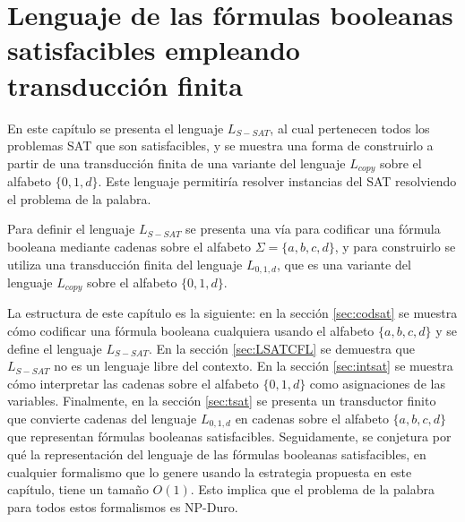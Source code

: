 


\chapter{Lenguaje de las fórmulas booleanas satisfacibles empleando transducción finita}
\label{chap:LSATFT}


En este capítulo se presenta el lenguaje $L_{S-SAT}$, al cual pertenecen todos los problemas SAT que son 
satisfacibles, y se muestra una forma de construirlo a partir de una transducción finita de una variante 
del lenguaje $L_{copy}$ sobre el alfabeto $\{0,1,d\}$. Este lenguaje permitiría resolver instancias del SAT resolviendo el problema de la palabra.  

Para definir el lenguaje $L_{S-SAT}$ se presenta una vía para codificar una fórmula booleana mediante cadenas sobre el alfabeto $\Sigma=\{a, b,c,d\}$, y para construirlo se utiliza una transducción finita del lenguaje $L_{0,1,d}$, que es una variante del lenguaje $L_{copy}$ sobre el alfabeto $\{0,1,d\}$.

La estructura de este capítulo es la siguiente: en la sección \ref{sec:codsat} se muestra cómo codificar una fórmula booleana cualquiera usando el alfabeto $\{a,b,c,d\}$ y se define el lenguaje $L_{S-SAT}$.  En la sección \ref{sec:LSATCFL} se demuestra que $L_{S-SAT}$ no es un lenguaje libre del contexto.  En la sección \ref{sec:intsat} se muestra cómo interpretar las cadenas sobre el alfabeto $\{0,1,d\}$ como asignaciones de las variables. Finalmente, en la sección \ref{sec:tsat} se presenta un transductor finito que convierte cadenas del lenguaje $L_{0,1,d}$ en cadenas sobre el alfabeto $\{a,b,c,d\}$ que representan fórmulas booleanas satisfacibles. Seguidamente, se conjetura por qué la representación del lenguaje de las fórmulas booleanas satisfacibles, en cualquier formalismo que lo genere usando la estrategia propuesta en este capítulo, tiene un tamaño $O(1)$. Esto implica que el problema de la palabra para todos estos formalismos es NP-Duro.


